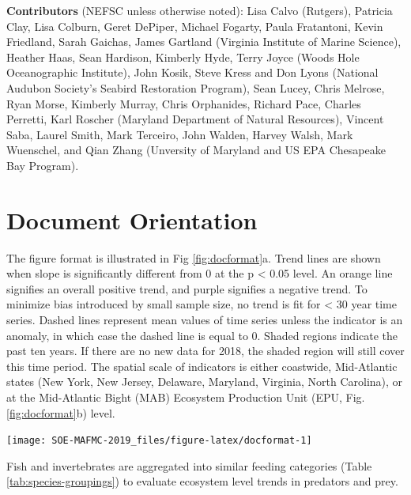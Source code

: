 \documentclass[10pt,]{article}
\let\origfigure\figure
\let\endorigfigure\endfigure
\renewenvironment{figure}[1][2] {
    \expandafter\origfigure\expandafter[H]
} {
    \endorigfigure
}
\begin{document}
\textbf{Contributors} (NEFSC unless otherwise noted): Lisa Calvo
(Rutgers), Patricia Clay, Lisa Colburn, Geret DePiper, Michael Fogarty,
Paula Fratantoni, Kevin Friedland, Sarah Gaichas, James Gartland
(Virginia Institute of Marine Science), Heather Haas, Sean Hardison,
Kimberly Hyde, Terry Joyce (Woods Hole Oceanographic Institute), John
Kosik, Steve Kress and Don Lyons (National Audubon Society's Seabird
Restoration Program), Sean Lucey, Chris Melrose, Ryan Morse, Kimberly
Murray, Chris Orphanides, Richard Pace, Charles Perretti, Karl Roscher
(Maryland Department of Natural Resources), Vincent Saba, Laurel Smith,
Mark Terceiro, John Walden, Harvey Walsh, Mark Wuenschel, and Qian Zhang
(Unversity of Maryland and US EPA Chesapeake Bay Program).

\newpage 

\section{Document Orientation}\label{document-orientation}

The figure format is illustrated in Fig \ref{fig:docformat}a. Trend
lines are shown when slope is significantly different from 0 at the p
\textless{} 0.05 level. An orange line signifies an overall positive
trend, and purple signifies a negative trend. To minimize bias
introduced by small sample size, no trend is fit for \textless{} 30 year
time series. Dashed lines represent mean values of time series unless
the indicator is an anomaly, in which case the dashed line is equal to
0. Shaded regions indicate the past ten years. If there are no new data
for 2018, the shaded region will still cover this time period. The
spatial scale of indicators is either coastwide, Mid-Atlantic states
(New York, New Jersey, Delaware, Maryland, Virginia, North Carolina), or
at the Mid-Atlantic Bight (MAB) Ecosystem Production Unit (EPU, Fig.
\ref{fig:docformat}b) level.

\begin{figure}

{\centering \texttt{[image: SOE-MAFMC-2019\_files/figure-latex/docformat-1]} 

}

\caption{Document orientation. a. Key to figures. b.The Northeast Large Marine Ecosystem.}\label{fig:docformat}
\end{figure}

Fish and invertebrates are aggregated into similar feeding categories
(Table \ref{tab:species-groupings}) to evaluate ecosystem level trends
in predators and prey.
\end{document}
